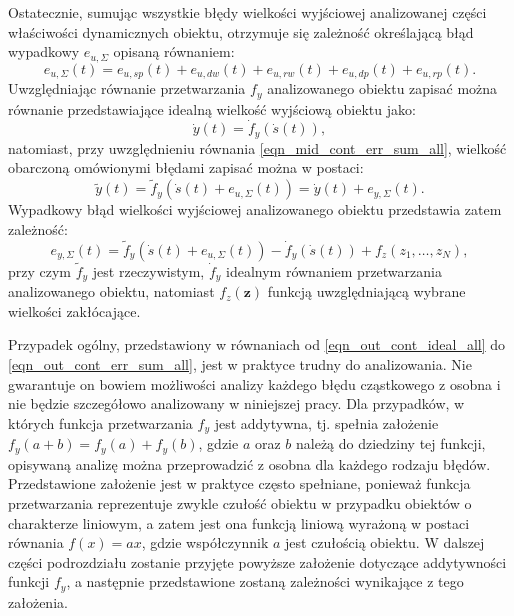 Ostatecznie, sumując wszystkie błędy wielkości wyjściowej analizowanej części właściwości dynamicznych obiektu, otrzymuje się zależność określającą błąd wypadkowy $e_{u,\Sigma}$ opisaną równaniem:
\begin{equation}
e_{u,\Sigma}(t) = e_{u,sp}(t) + e_{u,dw}(t) + e_{u,rw}(t) + e_{u,dp}(t) + e_{u,rp}(t) \label{eqn_mid_cont_err_sum_all}.
\end{equation}
Uwzględniając równanie przetwarzania $f_{y}$ analizowanego obiektu zapisać można równanie przedstawiające idealną wielkość wyjściową obiektu jako:
\begin{equation}
\dot{y}(t) = \dot{f}_{y} \left( \dot{s}(t) \right) \label{eqn_out_cont_ideal_all},
\end{equation}
natomiast, przy uwzględnieniu równania \eqref{eqn_mid_cont_err_sum_all}, wielkość obarczoną omówionymi błędami zapisać można w postaci:
\begin{equation}
\tilde{y}(t) = \tilde{f}_{y} \left( \dot{s}(t) + e_{u,\Sigma}(t) \right) = \dot{y}(t) + e_{y,\Sigma}(t) \label{eqn_out_cont_real_all}.
\end{equation}
Wypadkowy błąd wielkości wyjściowej analizowanego obiektu przedstawia zatem zależność:
\begin{equation}
e_{y,\Sigma}(t) = \tilde{f}_{y} \left( \dot{s}(t) + e_{u,\Sigma}(t) \right) - \dot{f}_{y} \left( \dot{s}(t) \right) + f_{z}(z_{1}, \hdots, z_{N}) \label{eqn_out_cont_err_sum_all},
\end{equation}
przy czym $\tilde{f}_{y}$ jest rzeczywistym, $\dot{f}_{y}$ idealnym równaniem przetwarzania analizowanego obiektu, natomiast $f_{z}(\mathbf{z})$ funkcją uwzględniającą wybrane wielkości zakłócające.

Przypadek ogólny, przedstawiony w równaniach od \eqref{eqn_out_cont_ideal_all} do \eqref{eqn_out_cont_err_sum_all}, jest w praktyce trudny do analizowania. Nie gwarantuje on bowiem możliwości analizy każdego błędu cząstkowego z osobna i nie będzie szczegółowo analizowany w niniejszej pracy. Dla przypadków, w których funkcja przetwarzania $f_{y}$ jest addytywna, tj. spełnia założenie $f_{y}(a + b) = f_{y}(a) + f_{y}(b)$, gdzie $a$ oraz $b$ należą do dziedziny tej funkcji, opisywaną analizę można przeprowadzić z osobna dla każdego rodzaju błędów. Przedstawione założenie jest w praktyce często spełniane, ponieważ funkcja przetwarzania reprezentuje zwykle czułość obiektu w przypadku obiektów o charakterze liniowym, a zatem jest ona funkcją liniową wyrażoną w postaci równania $f(x) = ax$, gdzie współczynnik $a$ jest czułością obiektu. W dalszej części podrozdziału zostanie przyjęte powyższe założenie dotyczące addytywności funkcji $f_{y}$, a następnie przedstawione zostaną zależności wynikające z tego założenia.

